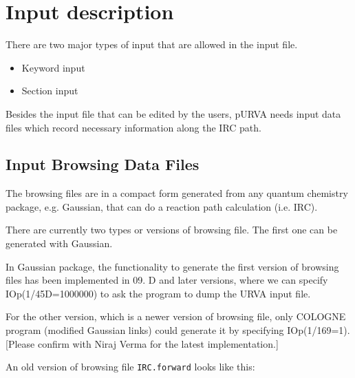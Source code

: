 
\chapter{Input description}

There are two major types of input that are allowed in the input file. 

\begin{itemize}
   \setlength{\itemsep}{0pt}
   \setlength{\parskip}{0pt}
   \setlength{\parsep}{0pt} 
    \item Keyword input
    \item Section input

\end{itemize}

Besides the input file that can be edited by the users, pURVA  needs  input data files which record  necessary information along the IRC path. 


\section{Input Browsing Data Files}

The browsing files are in a compact form generated from any quantum chemistry package, e.g. Gaussian, that can do a reaction path calculation (i.e. IRC). 

There are currently two types or versions of browsing file. The first one can be generated with Gaussian.

In Gaussian package, the functionality to generate the first version of browsing files has been implemented in 09. D  and later versions, where we can specify IOp(1/45D=1000000) to ask the program to dump the  {URVA} input file.

For the other version, which is a newer version of browsing file, only COLOGNE program (modified Gaussian links) could generate it by specifying  IOp(1/169=1). [Please confirm with Niraj Verma for the latest implementation.]




An old version of browsing file \texttt{IRC.forward} looks like this:

\lstset{basicstyle=\ttfamily\footnotesize,breaklines=true}






